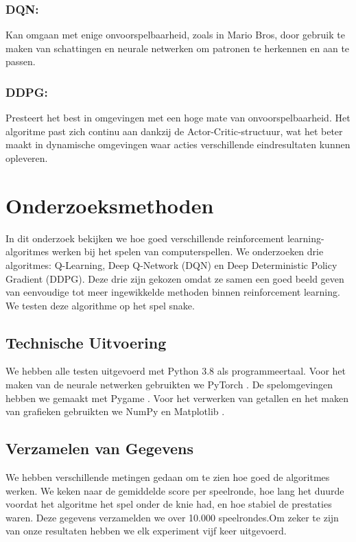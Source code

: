 \documentclass[a4paper,11pt]{report}
\begin{document}
\subsection*{DQN:}
Kan omgaan met enige onvoorspelbaarheid, zoals in Mario Bros, door gebruik te
maken van schattingen en neurale netwerken om patronen te herkennen en aan te
passen.

\subsection*{DDPG:}
Presteert het best in omgevingen met een hoge mate van onvoorspelbaarheid. Het
algoritme past zich continu aan dankzij de Actor-Critic-structuur, wat het
beter maakt in dynamische omgevingen waar acties verschillende eindresultaten
kunnen opleveren.

\chapter{Onderzoeksmethoden}
In dit onderzoek bekijken we hoe goed verschillende reinforcement
learning-algoritmes werken bij het spelen van computerspellen. We onderzoeken
drie algoritmes: Q-Learning, Deep Q-Network (DQN) en Deep Deterministic Policy
Gradient (DDPG). Deze drie zijn gekozen omdat ze samen een goed beeld geven van
eenvoudige tot meer ingewikkelde methoden binnen reinforcement learning. We
testen deze algorithme op het spel snake.

\section{Technische Uitvoering}
We hebben alle testen uitgevoerd met Python 3.8 \cite{python_docs} als
programmeertaal. Voor het maken van de neurale netwerken gebruikten we PyTorch
\cite{pytorch_docs}. De spelomgevingen hebben we gemaakt met Pygame
\cite{pygame}. Voor het verwerken van getallen en het maken van grafieken
gebruikten we NumPy \cite{numpy_docs} en Matplotlib \cite{matplotlib_docs}.

\section{Verzamelen van Gegevens}
We hebben verschillende metingen gedaan om te zien hoe goed de algoritmes
werken. We keken naar de gemiddelde score per speelronde, hoe lang het duurde
voordat het algoritme het spel onder de knie had, en hoe stabiel de prestaties
waren. Deze gegevens verzamelden we over 10.000 speelrondes.Om zeker te zijn
van onze resultaten hebben we elk experiment vijf keer uitgevoerd.
\end{document}
